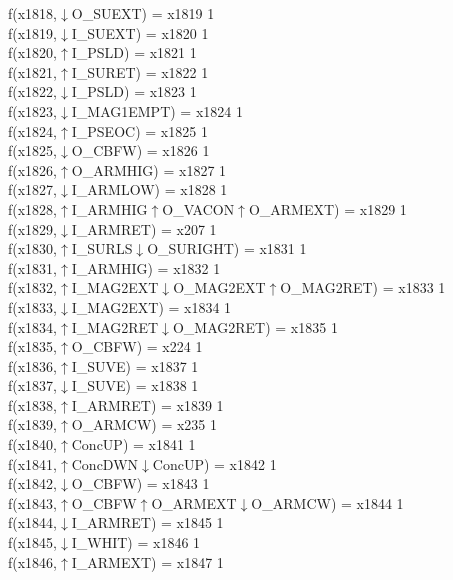 f(x1818,$\downarrow$O\_SUEXT) = x1819 {1} \\
f(x1819,$\downarrow$I\_SUEXT) = x1820 {1} \\
f(x1820,$\uparrow$I\_PSLD) = x1821 {1} \\
f(x1821,$\uparrow$I\_SURET) = x1822 {1} \\
f(x1822,$\downarrow$I\_PSLD) = x1823 {1} \\
f(x1823,$\downarrow$I\_MAG1EMPT) = x1824 {1} \\
f(x1824,$\uparrow$I\_PSEOC) = x1825 {1} \\
f(x1825,$\downarrow$O\_CBFW) = x1826 {1} \\
f(x1826,$\uparrow$O\_ARMHIG) = x1827 {1} \\
f(x1827,$\downarrow$I\_ARMLOW) = x1828 {1} \\
f(x1828,$\uparrow$I\_ARMHIG$\uparrow$O\_VACON$\uparrow$O\_ARMEXT) = x1829 {1} \\
f(x1829,$\downarrow$I\_ARMRET) = x207 {1} \\
f(x1830,$\uparrow$I\_SURLS$\downarrow$O\_SURIGHT) = x1831 {1} \\
f(x1831,$\uparrow$I\_ARMHIG) = x1832 {1} \\
f(x1832,$\uparrow$I\_MAG2EXT$\downarrow$O\_MAG2EXT$\uparrow$O\_MAG2RET) = x1833 {1} \\
f(x1833,$\downarrow$I\_MAG2EXT) = x1834 {1} \\
f(x1834,$\uparrow$I\_MAG2RET$\downarrow$O\_MAG2RET) = x1835 {1} \\
f(x1835,$\uparrow$O\_CBFW) = x224 {1} \\
f(x1836,$\uparrow$I\_SUVE) = x1837 {1} \\
f(x1837,$\downarrow$I\_SUVE) = x1838 {1} \\
f(x1838,$\uparrow$I\_ARMRET) = x1839 {1} \\
f(x1839,$\uparrow$O\_ARMCW) = x235 {1} \\
f(x1840,$\uparrow$ConcUP) = x1841 {1} \\
f(x1841,$\uparrow$ConcDWN$\downarrow$ConcUP) = x1842 {1} \\
f(x1842,$\downarrow$O\_CBFW) = x1843 {1} \\
f(x1843,$\uparrow$O\_CBFW$\uparrow$O\_ARMEXT$\downarrow$O\_ARMCW) = x1844 {1} \\
f(x1844,$\downarrow$I\_ARMRET) = x1845 {1} \\
f(x1845,$\downarrow$I\_WHIT) = x1846 {1} \\
f(x1846,$\uparrow$I\_ARMEXT) = x1847 {1} \\
